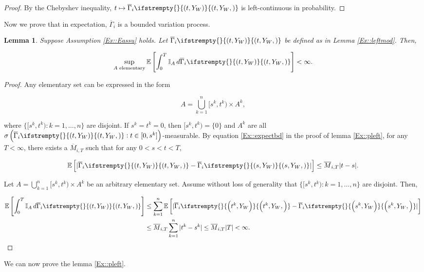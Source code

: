 \documentclass[12pt]{article}
\newcommand{\mb}{\mathbb}
\newcommand{\ov}{\overline}
\newcommand{\te}{\text}
\newcommand{\ex}[1]{\mb{E}\left[#1\right]}			%
\newcommand{\indx}[1]{^{#1}}						%
\newcommand{\vind}[1]{_{#1}}						%
\newcommand{\stpara}[1]{_{#1}}						%
\newcommand{\tmepro}[3]{
\ifstrempty{#3}{
	\left(#1,#2\right)}{
	\left(#1,#2,#3\right)}}							%
\newcommand{\Xg}{Y}									%
\newcommand{\ratee}{\Gamma}							%
\newcommand{\grate}{\ov{\ratee}}					%
\newcommand{\const}{M}								%
\newcommand{\sttpara}[2]{_{#1,#2}}					%
\newcommand{\typset}{A}							%
\newtheorem{lem}[thms]{Lemma}
\begin{document}
\begin{proof}
By the Chebyshev inequality, \(t \mapsto \grate\stpara{i}\tmepro{t}{\Xg\vind{W}}{}\) is left-continuous in probability.
\end{proof}

Now we prove that in expectation, \(\grate\stpara{i}\) is a bounded variation process.

\begin{lem}
Suppose Assumption \ref{Ex::Eassu} holds. Let \(\grate\stpara{i}\tmepro{t}{\Xg\vind{W}}{}\) be defined as in Lemma \ref{Ex::leftmod}. Then, 

\[\sup_{\typset\te{ elementary}} \ex{\int_0^T \mb{I}_\typset\,d\grate\stpara{i}\tmepro{t}{\Xg\vind{W}}{}} < \infty.\]
\label{Ex::bddvar}
\end{lem}

\begin{proof}
Any elementary set can be expressed in the form

\[\typset = \bigcup_{k = 1}^n [s\indx{k},t\indx{k})\times \typset\indx{k},\]

where \(\{[s\indx{k},t\indx{k}):k=1,\dots,n\}\) are disjoint. If \(s\indx{k} = t\indx{k} = 0\), then \([s\indx{k},t\indx{k}) = \{0\}\) and \(\typset\indx{k}\) are all \(\sigma\left(\grate\stpara{i}\tmepro{t}{\Xg\vind{W}}{}:t\in [0,s\indx{k}]\right)\)-measurable. By equation \eqref{Ex::expectbd} in the proof of lemma \ref{Ex::pleft}, for any \(T < \infty\), there exists a \(\ov{\const}\sttpara{i}{T}\) such that for any \(0 < s < t < T\),

\[\ex{|\grate\stpara{i}\tmepro{t}{\Xg\vind{W}}{} - \grate\stpara{i}\tmepro{s}{\Xg\vind{W}}{}|} \leq \ov{\const}\sttpara{i}{T}|t-s|.\]

Let \(\typset = \bigcup_{k = 1}^n [s\indx{k},t\indx{k})\times \typset\indx{k}\) be an arbitrary elementary set. Assume without loss of generality that \(\{[s\indx{k},t\indx{k}):k = 1,\dots,n\}\) are disjoint. Then,

\begin{align*}
\ex{\int_0^T \mb{I}_A\,d\grate\stpara{i}\tmepro{t}{\Xg\vind{W}}{}} &\leq \sum_{k=1}^n \ex{|\grate\stpara{i}\tmepro{t\indx{k}}{\Xg\vind{W}}{} - \grate\stpara{i}\tmepro{s\indx{k}}{\Xg\vind{W}}{}|}\\
&\leq \ov{\const}\sttpara{i}{T}\sum_{k=1}^n |t\indx{k} - s\indx{k}| \leq \ov{\const}\sttpara{i}{T}|T| < \infty.
\end{align*} 
\end{proof}

We can now prove the lemma \ref{Ex::pleft}.
\end{document}
